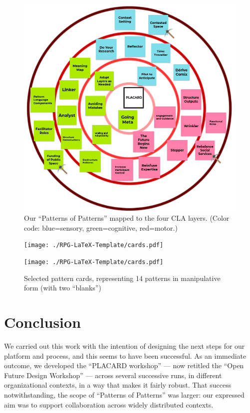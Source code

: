 \documentclass[acmlarge,timestamp]{acmart}
\begin{document}
\begin{figure}[p]
\includegraphics[trim={0 0 0 .1cm},clip=true, width=.9\textwidth]{revised-patterns-map.png}
\caption{Our “Patterns of Patterns” mapped to the four CLA layers. (Color code: blue=sensory, green=cognitive, red=motor.)\label{pattern-analysis}}
\end{figure}

\begin{figure}[h]
\begin{center}
\texttt{[image: ./RPG-LaTeX-Template/cards.pdf]}

\vspace{-.5cm}
  \noindent\texttt{[image: ./RPG-LaTeX-Template/cards.pdf]}
\end{center}
\vspace{-1cm}
\caption{Selected pattern cards, representing 14 patterns in manipulative form (with two “blanks”)\label{revised-cards}}
\end{figure}
\FloatBarrier

\section{Conclusion}

We carried out this work with the intention of designing the next
steps for our platform and process, and this seems to have been
successful.  As an immediate outcome, we developed the “PLACARD
workshop” — now retitled the “Open Future Design Workshop” — across
several successive runs, in different organizational contexts, in a
way that makes it fairly robust.  That success notwithstanding, the
scope of “Patterns of Patterns” was larger: our expressed aim was to
support collaboration across widely distributed contexts.
\end{document}
